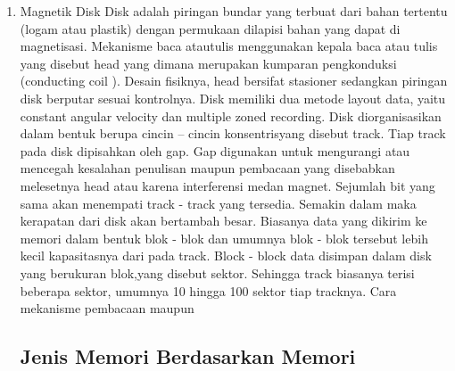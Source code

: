 \documentclass{article}
\begin{document}
\begin{enumerate}
\item Magnetik Disk  Disk adalah piringan bundar yang terbuat dari bahan tertentu (logam atau plastik) dengan permukaan dilapisi bahan yang dapat di magnetisasi. Mekanisme baca atautulis menggunakan kepala baca atau tulis yang disebut head yang dimana merupakan kumparan pengkonduksi (conducting coil ). Desain fisiknya, head bersifat stasioner sedangkan piringan disk berputar sesuai kontrolnya. Disk memiliki dua metode layout data, yaitu  constant angular velocity dan multiple zoned recording. Disk diorganisasikan dalam bentuk berupa cincin – cincin
konsentrisyang disebut track. Tiap track pada disk dipisahkan oleh gap. Gap digunakan untuk mengurangi atau mencegah kesalahan penulisan maupun pembacaan yang disebabkan melesetnya head atau karena interferensi medan magnet. Sejumlah bit yang sama akan menempati track - track yang tersedia. Semakin dalam maka kerapatan dari disk akan bertambah besar. Biasanya data yang dikirim ke memori dalam bentuk blok - blok dan umumnya blok - blok tersebut lebih kecil kapasitasnya dari pada track. Block - block data disimpan dalam disk yang berukuran blok,yang disebut sektor. Sehingga track biasanya terisi beberapa sektor, umumnya 10 hingga 100 sektor tiap tracknya. Cara mekanisme pembacaan maupun 



\subsection {Jenis Memori Berdasarkan Memori}








\end{enumerate}
\end{document}
